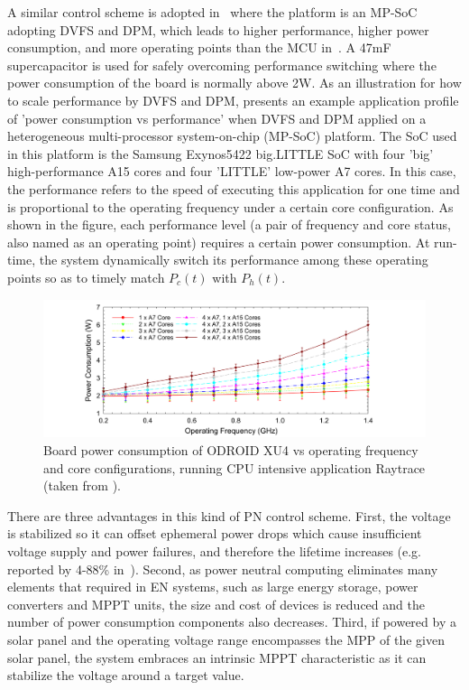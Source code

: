 A similar control scheme is adopted in~\cite{fletcher2017power} where the platform is an MP-SoC adopting DVFS and DPM, which leads to higher performance, higher power consumption, and more operating points than the MCU in~\cite{balsamo2016graceful}. A 47mF supercapacitor is used for safely overcoming performance switching where the power consumption of the board is normally above 2W. As an illustration for how to scale performance by DVFS and DPM,  presents an example application profile of 'power consumption vs performance' when DVFS and DPM applied on a heterogeneous multi-processor system-on-chip (MP-SoC) platform. The SoC used in this platform is the Samsung Exynos5422 big.LITTLE SoC with four 'big' high-performance A15 cores and four 'LITTLE' low-power A7 cores. In this case, the performance refers to the speed of executing this application for one time and is proportional to the operating frequency under a certain core configuration. As shown in the figure, each performance level (a pair of frequency and core status, also named as an operating point) requires a certain power consumption. At run-time, the system dynamically switch its performance among these operating points so as to timely match $P_c(t)$ with $P_h(t)$.

\begin{figure}
    \centering
    \includegraphics[width=\columnwidth]{ch2_review/figures/dvfs}
    \caption{Board power consumption of ODROID XU4 vs operating frequency and core configurations, running CPU intensive application Raytrace (taken from \cite{fletcher2017power}).}
    \label{Figure:dvfs}
\end{figure}

There are three advantages in this kind of PN control scheme. First, the voltage is stabilized so it can offset ephemeral power drops which cause insufficient voltage supply and power failures, and therefore the lifetime increases (e.g. reported by 4-88\% in~\cite{balsamo2016graceful}). Second, as power neutral computing eliminates many elements that required in EN systems, such as large energy storage, power converters and MPPT units, the size and cost of devices is reduced and the number of power consumption components also decreases. Third, if powered by a solar panel and the operating voltage range encompasses the MPP of the given solar panel, the system embraces an intrinsic MPPT characteristic as it can stabilize the voltage around a target value.

